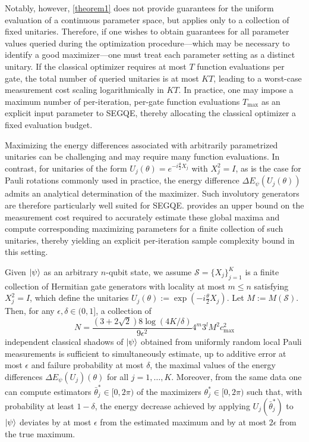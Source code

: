 Notably, however, \cref{theorem1} does not provide guarantees for the uniform evaluation of a continuous parameter space, but applies only to a collection of fixed unitaries. Therefore, if one wishes to obtain guarantees for all parameter values queried during the optimization procedure---which may be necessary to identify a good maximizer---one must treat each parameter setting as a distinct unitary. If the classical optimizer requires at most $T$ function evaluations per gate, the total number of queried unitaries is at most $KT$, leading to a worst-case measurement cost scaling logarithmically in $KT$. In practice, one may impose a maximum number of per-iteration, per-gate function evaluations $T_\mathrm{max}$ as an explicit input parameter to SEGQE, thereby allocating the classical optimizer a fixed evaluation budget. 

Maximizing the energy differences associated with arbitrarily parametrized unitaries can be challenging and may require many function evaluations. In contrast, for unitaries of the form $U_j(\theta)=e^{-i\frac{\theta}{2}X_j }$ with $X_j^2=I$, as is the case for Pauli rotations commonly used in practice, the energy difference $\Delta E_\psi(U_j(\theta))$ admits an analytical determination of the maximizer. Such involutory generators are therefore particularly well suited for SEGQE.  provides an upper bound on the measurement cost required to accurately estimate these global maxima and compute corresponding maximizing parameters for a finite collection of such unitaries, thereby yielding an explicit per-iteration sample complexity bound in this setting.

\begin{theorem}
    \label{theorem2}
    Given $\ket{\psi}$ as an arbitrary $n$-qubit state, we assume $\mathcal{S}=\{X_j\}_{j=1}^K$ is a finite collection of Hermitian gate generators
    with locality at most $m\leq n$ satisfying $X_j^2=I$, which define the unitaries $U_j(\theta):=\exp\left(-i\frac{\theta}{2}X_j\right)$.
    Let $M:=M(\mathcal{S})$. Then, for any $\epsilon, \delta \in (0,1]$, a collection of
    \begin{equation}
        N =\frac{\left(3+2\sqrt{2}\right)8\log\left(4K/\delta\right)}{9\epsilon^2}4^m3^{l}M^2c_\mathrm{max}^2
    \end{equation}
    independent classical shadows of $\ket{\psi}$ obtained from uniformly random local Pauli measurements is sufficient to simultaneously estimate, up to additive error at most $\epsilon$ and failure probability at most $\delta$, the maximal values of the energy differences $\Delta E_\psi(U_j)(\theta)$ for all $j=1,\ldots,K$. Moreover, from the same data one can compute estimators $\bar{\theta}^*_j\in [0,2\pi)$ of the maximizers $\theta^*_j\in [0,2\pi)$ such that, with probability at least $1-\delta$, the energy decrease achieved by applying $U_j(\bar{\theta}^*_j)$ to $\ket{\psi}$ deviates by at most $\epsilon$ from the estimated maximum and by at most $2\epsilon$ from the true maximum.
\end{theorem}

